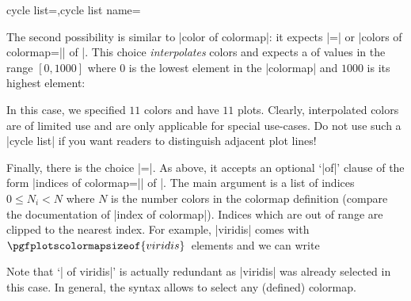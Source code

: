 \begin{pgfplotskeylist}{cycle list=,cycle list name=}
{The second possibility is similar to |color of colormap|: it expects |=| or |colors of colormap=|| of |. This choice \emph{interpolates} colors and expects a  of values in the range $[0,1000]$ where $0$ is the lowest element in the |colormap| and $1000$ is its highest element:
\begin{codeexample}[]
\end{codeexample}
In this case, we specified $11$ colors and have $11$ plots. Clearly, interpolated colors are of limited use and are only applicable for special use-cases. Do not use such a |cycle list| if you want readers to distinguish adjacent plot lines!

Finally, there is the choice |=|. As above, it accepts an optional `|of|' clause of the form |indices of colormap=|| of |. The main argument is a list of indices $0\le N_i < N$ where $N$ is the number colors in the colormap definition (compare the documentation of |index of colormap|). Indices which are out of range are clipped to the nearest index. For example, |viridis| comes with $\pgfplotscolormapsizeof{viridis}$~elements and we can write
\begin{codeexample}[]
\end{codeexample}
Note that `| of viridis|' is actually redundant as |viridis| was already selected in this case. In general, the syntax allows to select any (defined) colormap. 

}
\end{pgfplotskeylist}
